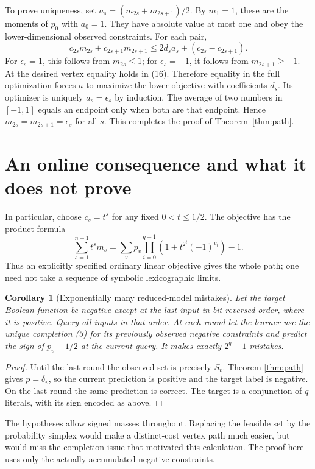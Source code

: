 \documentclass[11pt]{article}
\newtheorem{corollary}[theorem]{Corollary}
\begin{document}
To prove uniqueness, set $a_s=(m_{2s}+m_{2s+1})/2$. By $m_1=1$,
these are the moments of $p_0$ with $a_0=1$. They have absolute value
at most one and obey the lower-dimensional observed constraints.
For each pair,
\[
 c_{2s}m_{2s}+c_{2s+1}m_{2s+1}
              \le 2d_s a_s+(c_{2s}-c_{2s+1}).           \tag{16}
\]
For $\epsilon_s=1$, this follows from $m_{2s}\le1$; for
$\epsilon_s=-1$, it follows from $m_{2s+1}\ge-1$.
At the desired vertex equality holds in (16). Therefore equality in
the full optimization forces $a$ to maximize the lower objective with
coefficients $d_s$. Its optimizer is uniquely $a_s=\epsilon_s$ by
induction. The average of two numbers in $[-1,1]$ equals an endpoint
only when both are that endpoint. Hence
$m_{2s}=m_{2s+1}=\epsilon_s$ for all $s$. This completes the proof of
Theorem~\ref{thm:path}.

\section{An online consequence and what it does not prove}
In particular, choose $c_s=t^s$ for any fixed $0<t\le1/2$. The objective
has the product formula
\[
 \sum_{s=1}^{n-1}t^s m_s
 =\sum_vp_v\prod_{i=0}^{q-1}(1+t^{2^i}(-1)^{v_i})-1. \tag{17}
\]
Thus an explicitly specified ordinary linear objective gives the whole
path; one need not take a sequence of symbolic lexicographic limits.

\begin{corollary}[Exponentially many reduced-model mistakes]
Let the target Boolean function be negative except at the last input
in bit-reversed order, where it is positive. Query all inputs in that
order. At each round let the learner use the unique completion (3) for
its previously observed negative constraints and predict the sign of
$p_v-1/2$ at the current query. It makes exactly $2^q-1$ mistakes.
\end{corollary}
\begin{proof}
Until the last round the observed set is precisely $S_v$. Theorem
\ref{thm:path} gives $p=\delta_v$, so the current prediction is positive
and the target label is negative. On the last round the same prediction
is correct. The target is a conjunction of $q$ literals, with its sign
encoded as above.
\end{proof}

The hypotheses allow signed masses throughout. Replacing the feasible
set by the probability simplex would make a distinct-cost vertex path
much easier, but would miss the completion issue that motivated this
calculation. The proof here uses only the actually accumulated negative
constraints.
\end{document}
